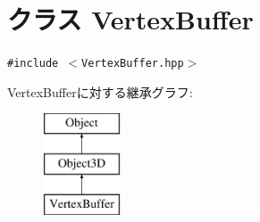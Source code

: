 \hypertarget{classm3g_1_1VertexBuffer}{
\section{クラス VertexBuffer}
\label{classm3g_1_1VertexBuffer}
}
{\tt \#include $<$VertexBuffer.hpp$>$}

VertexBufferに対する継承グラフ:\begin{figure}[H]
\begin{center}
\leavevmode
\includegraphics[height=3cm]{classm3g_1_1VertexBuffer}
\end{center}
\end{figure}
